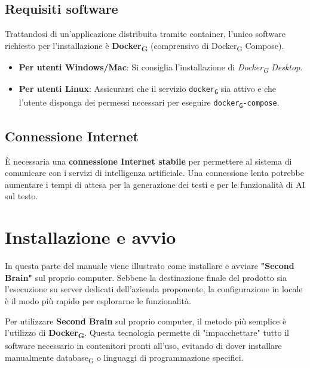 \documentclass[11pt,a4paper]{article}
\newcommand{\gls}[1]{#1\textsubscript{G}}
\begin{document}
\subsection{Requisiti software}
Trattandosi di un'applicazione distribuita tramite container, l'unico software richiesto per l'installazione è \textbf{\gls{Docker}} (comprensivo di \gls{Docker} Compose).
\begin{itemize}
    \item \textbf{Per utenti Windows/Mac}: Si consiglia l'installazione di \textit{\gls{Docker} Desktop}.
    \item \textbf{Per utenti Linux}: Assicurarsi che il servizio \texttt{\gls{docker}} sia attivo e che l'utente disponga dei permessi necessari per eseguire \texttt{\gls{docker}-compose}.
\end{itemize}

\subsection{Connessione Internet}
È necessaria una \textbf{connessione Internet stabile} per permettere al sistema di comunicare con i servizi di intelligenza artificiale. Una connessione lenta potrebbe aumentare i tempi di attesa per la generazione dei testi e per le funzionalità di AI sul testo.


\newpage

\section{Installazione e avvio}
In questa parte del manuale viene illustrato come installare e avviare \textbf{"Second Brain"} sul proprio computer. Sebbene la destinazione finale del prodotto sia l'esecuzione su server dedicati dell'azienda proponente, la configurazione in locale è il modo più rapido per esplorarne le funzionalità.

Per utilizzare \textbf{Second Brain} sul proprio computer, il metodo più semplice è l'utilizzo di \textbf{\gls{Docker}}. Questa tecnologia permette di "impacchettare" tutto il software necessario in contenitori pronti all'uso, evitando di dover installare manualmente \gls{database} o linguaggi di programmazione specifici.
\end{document}

